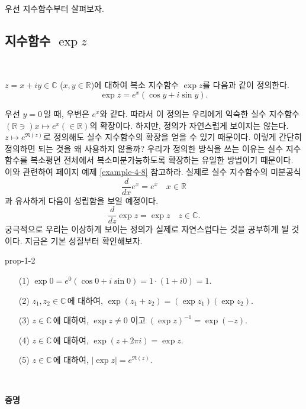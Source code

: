 우선  지수함수부터 살펴보자.


\subsection{지수함수 $\exp z$} \label{sec-1-4-1}

\

\begin{saltdefinition}[복소 지수함수] {}{} \label{def-1-2}
$z=x+iy\in \mathbb C$ ($x,y\in\mathbb R$)에 대하여
복소 지수함수 $\exp z$를 다음과 같이 정의한다.
$$
\exp z = e^x(\cos y +i\sin y).
$$
\end{saltdefinition}

우선 $y=0$\,일 때, 우변은 $e^x$와 같다. 따라서 이 정의는
우리에게 익숙한 실수 지수함수 $(\mathbb R \ni) x \mapsto e^x (\in \mathbb R)$의 확장이다.
하지만, 정의가 자연스럽게 보이지는 않는다. 
$z\mapsto e^{\Re(z)}$로 정의해도 실수 지수함수의 확장을 얻을 수 있기 때문이다.
이렇게 간단히 정의하면 되는 것을 왜 사용하지 않을까?
우리가 정의한 방식을 쓰는 이유는
실수 지수함수를 복소평면 전체에서 복소미분가능하도록
확장하는 유일한 방법이기 때문이다. 
이와 관련하여 
\pageref{ex-page-4-8}페이지 %
예제 \ref{example-4-8}\를%
참고하라.
실제로 실수 지수함수의 미분공식
$$
\dfrac{d}{dx}e^x  = e^x \quad x\in\mathbb R
$$
과 유사하게 다음이 성립함을 보일 예정이다.
$$
\dfrac{d}{dz} \exp z  = \exp z \quad z\in\mathbb C.
$$
궁극적으로 우리는 이상하게 보이는 정의가 실제로 자연스럽다는 것을 공부하게 될 것이다.
지금은 기본 성질부터 확인해보자.


\begin{saltprop} {prop-1-2} {} %
\begin{itemize}
\item[(1)] $\exp 0 = e^0(\cos 0 + i\sin 0) = 1\cdot(1+i0) = 1$.
\item[(2)] $z_1, z_2\in \mathbb C\,$에 대하여, $\exp(z_1+z_2) = (\exp z_1)(\exp z_2)$.
\item[(3)] $z \in \mathbb C\,$에 대하여, $\exp z \ne 0$ 이고 $(\exp z)^{-1} = \exp (-z)$.
\item[(4)] $z \in \mathbb C\,$에 대하여, $\exp(z+2\pi i) = \exp z$.
\item[(5)] $z \in \mathbb C\,$에 대하여, $|\exp z| = e^{\Re(z)}$.
\end{itemize}
\  %
\end{saltprop}

{\bf 증명}

